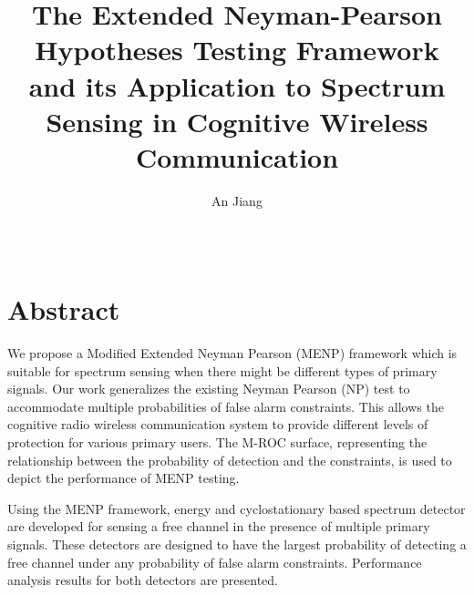 \documentclass [12pt,letterpaper]{report}
\begin{document}
\nopagebreak[4]
\title{The Extended Neyman-Pearson Hypotheses Testing Framework and its Application to Spectrum Sensing in Cognitive Wireless Communication}
\author{An Jiang}
\date{\Month\ \number\year}


  \pagebreak[2]
\maketitle

\raggedbottom
\doublespacing
{}

\section*{\centering Abstract}
We propose a Modified Extended Neyman Pearson (MENP) framework which is suitable for spectrum sensing when there might be different types of primary signals. Our work generalizes the existing Neyman Pearson (NP) test to accommodate multiple probabilities of false alarm constraints. This allows the cognitive radio wireless communication system to provide different levels of protection for various primary users.  
The M-ROC surface, representing the relationship between the probability of detection and the constraints, is used to depict the performance of MENP testing.   

Using the MENP framework, energy and cyclostationary based spectrum detector are developed for sensing a free channel in the presence of multiple primary signals. 
These detectors are designed to have the largest probability of detecting a free channel under any probability of false alarm constraints.  
Performance analysis results  for both detectors are presented.  
\newpage
\end{document}
